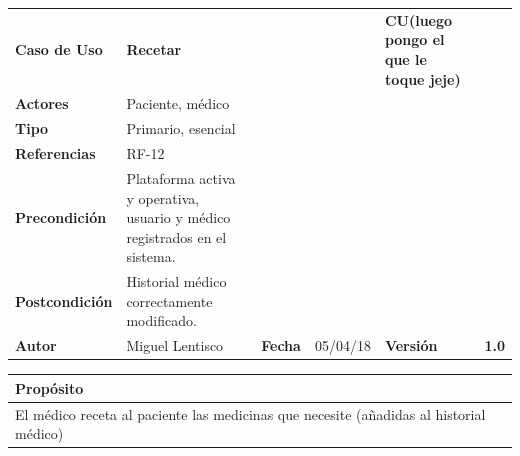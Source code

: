 \documentclass[11pt,a4paper]{article}
\begin{document}


\begin{table}[h]
	\centering
	\begin{tabular}{|l|lllll}
		\cline{1-1} \cline{6-6}
		\textbf{Caso de Uso}   & \textbf{Recetar} &   &  & \multicolumn{1}{l|}{\textbf{\textbf{CU(luego pongo el que le toque jeje)}}}        & \multicolumn{1}{l|}{\textbf{}} \\ \cline{1-1} \cline{6-6} 
		\textbf{Actores}       & Paciente, médico  &                                     &                       &                                       & \textbf{}                      \\ \cline{1-1}
		\textbf{Tipo}          & Primario, esencial  &                                     &                       &                                       & \textbf{}                      \\ \cline{1-1}
		\textbf{Referencias}   & RF-12 &   &                       &                                       & \textbf{}                      \\ \cline{1-1}
		\textbf{Precondición}  & Plataforma activa y operativa, usuario y médico registrados en el sistema.                          &                      &                & \textbf{}                      \\ \cline{1-1}
		\textbf{Postcondición} & Historial médico correctamente modificado.                     &                                     &                       &                                       &                                \\ \cline{1-1} \cline{3-3} \cline{5-5}
		\textbf{Autor}         & \multicolumn{1}{l|}{Miguel Lentisco} & \multicolumn{1}{l|}{\textbf{Fecha}} & \multicolumn{1}{l|}{05/04/18} & \multicolumn{1}{l|}{\textbf{Versión}} & \textbf{1.0}                      \\ \cline{1-1} \cline{3-3} \cline{5-5}
	\end{tabular}
\end{table}

\begin{table}[h]
	\centering
	\begin{tabular}{l}
		\hline
		\multicolumn{1}{|l|}{Propósito} \\ \hline
		El médico receta al paciente las medicinas que necesite (añadidas al historial médico)
	\end{tabular}
\end{table}
\end{document}

